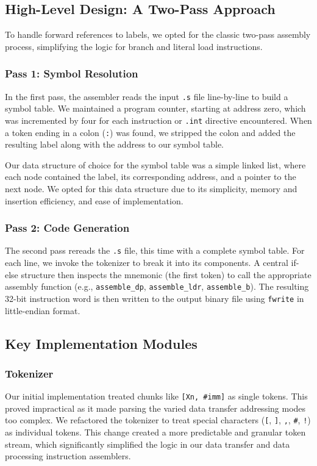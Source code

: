 \documentclass[11pt]{article}
\begin{document}
\subsection{High-Level Design: A Two-Pass Approach}

To handle forward references to labels, we opted for the classic two-pass assembly process, 
simplifying the logic for branch and literal load instructions.

\subsubsection{Pass 1: Symbol Resolution}
In the first pass, the assembler reads the input \texttt{.s} file line-by-line to build a symbol table. 
We maintained a program counter, starting at address zero, which was incremented by four for each instruction or \texttt{.int} 
directive encountered. When a token ending in a colon (\texttt{:}) was found, 
we stripped the colon and added the resulting label along with the address to our symbol table. 

Our data structure of choice for the symbol table was a simple linked list, where each node contained the label,
its corresponding address, and a pointer to the next node. We opted for this data structure due to its simplicity, 
memory and insertion efficiency, and ease of implementation.  


\subsubsection{Pass 2: Code Generation}
The second pass rereads the \texttt{.s} file, this time with a complete symbol table. 
For each line, we invoke the tokenizer to break it into its components. 
A central if-else structure then inspects the mnemonic (the first token) to call the appropriate assembly function 
(e.g., \texttt{assemble\_dp}, \texttt{assemble\_ldr}, \texttt{assemble\_b}). 
The resulting 32-bit instruction word is then written to the output binary file using \texttt{fwrite} in little-endian format.

\subsection{Key Implementation Modules}

\subsubsection{Tokenizer}
Our initial implementation treated chunks like \texttt{[Xn, \#imm]} as single tokens. 
This proved impractical as it made parsing the varied data transfer addressing modes too complex. 
We refactored the tokenizer to treat special characters (\texttt{[}, \texttt{]}, \texttt{,}, \texttt{\#}, \texttt{!}) as individual tokens. 
This change created a more predictable and granular token stream,
which significantly simplified the logic in our data transfer and data processing instruction assemblers.
\end{document}

